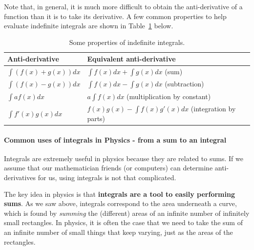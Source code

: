 Note that, in general, it is much more difficult to obtain the anti-derivative of a function than it is to take its derivative. A few common properties to help evaluate indefinite integrals are shown in Table~\ref{tab:Calculus:intprops} below.

\begin{table}
\centering
\caption[]{Some properties of indefinite integrals.}
\label{tab:Calculus:intprops}
\begin{tabular}{p{}p{}}
\toprule
\textbf{Anti-derivative} & \textbf{Equivalent anti-derivative} \\
\hline
$\int (f(x)+g(x)) dx$ & $\int f(x)dx+\int g(x) dx$ (sum) \\
$\int (f(x) -g(x)) dx$ & $\int f(x)dx -\int g(x) dx$ (subtraction) \\
$\int af(x) dx$ & $a\int f(x)dx$ (multiplication by constant) \\
$\int f'(x)g(x) dx$ & $f(x)g(x) -\int f(x)g'(x) dx$ (integration by parts) \\
\bottomrule
\end{tabular}
\end{table}

\paragraph{Common uses of integrals in Physics - from a sum to an integral}

Integrals are extremely useful in physics because they are related to sums. If we assume that our mathematician friends (or computers) can determine anti-derivatives for us, using integrals is not that complicated.

The key idea in physics is that \textbf{integrals are a tool to easily performing sums}. As we saw above, integrals correspond to the area underneath a curve, which is found by \textit{summing} the (different) areas of an infinite number of infinitely small rectangles. In physics, it is often the case that we need to take the sum of an infinite number of small things that keep varying, just as the areas of the rectangles.

